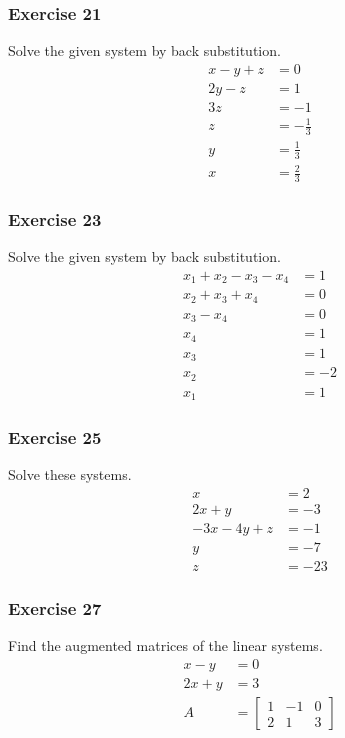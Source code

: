 \documentclass{math}
\begin{document}
\subsubsection*{Exercise 21}
Solve the given system by back substitution.
\begin{align*}
  x-y+z &= 0 \\
  2y-z &= 1 \\
  3z &= -1 \\
  z &= -\frac{1}{3} \\
  y &= \frac{1}{3} \\
  x &= \frac{2}{3}
\end{align*}

\subsubsection*{Exercise 23}
Solve the given system by back substitution.
\begin{align*}
  x_1+x_2-x_3-x_4 &= 1 \\
  x_2+x_3+x_4 &= 0 \\
  x_3-x_4 &= 0 \\
  x_4 &= 1 \\
  x_3 &= 1 \\
  x_2 &= -2 \\
  x_1 &= 1
\end{align*}

\subsubsection*{Exercise 25}
Solve these systems.
\begin{align*}
  x &= 2 \\
  2x+y &= -3 \\
  -3x-4y+z &= -1 \\
  y &= -7 \\
  z &= -23
\end{align*}

\subsubsection*{Exercise 27}
Find the augmented matrices of the linear systems.
\begin{align*}
  x-y &= 0 \\
  2x+y &= 3 \\
  A &= \left[\begin{array}{cc|c}
    1 & -1 & 0 \\
    2 & 1 & 3
  \end{array}\right]
\end{align*}
\end{document}
